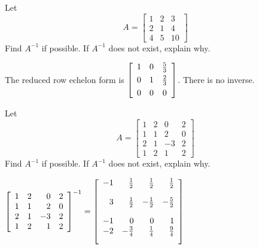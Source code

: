 \documentclass{ximera}
\begin{document}
\begin{problem}\label{prb:4.42}Let
\begin{equation*}
A=\left[
\begin{array}{rrr}
1 & 2 & 3 \\
2 & 1 & 4 \\
4 & 5 & 10
\end{array}
\right]
\end{equation*}
Find $A^{-1}$ if possible. If $A^{-1}$ does not exist, explain why.
\begin{hint}
The reduced row echelon form is
$\left[
\begin{array}{ccc}
1 & 0 & \vspace{0.05in}\frac{5}{3} \\
0 & 1 & \vspace{0.05in}\frac{2}{3} \\
0 & 0 & 0
\end{array}
\right]$. There is no inverse.
\end{hint}
\end{problem}

\begin{problem}\label{prb:4.43}Let
\begin{equation*}
A=\left[
\begin{array}{rrrr}
1 & 2 & 0 & 2 \\
1 & 1 & 2 & 0 \\
2 & 1 & -3 & 2 \\
1 & 2 & 1 & 2
\end{array}
\right]
\end{equation*}
Find $A^{-1}$ if possible. If $A^{-1}$ does not exist, explain why.
\begin{hint}
$\left[
\begin{array}{rrrr}
1 & 2 & 0 & 2 \\
1 & 1 & 2 & 0 \\
2 & 1 & -3 & 2 \\
1 & 2 & 1 & 2
\end{array}
\right]^{-1}= \left[
\begin{array}{rrrr}
-1 & \vspace{0.05in}\frac{1}{2} &  \vspace{0.05in}\frac{1}{2} &  \vspace{0.05in}\frac{1}{2} \\
3 &  \vspace{0.05in}\frac{1}{2} & - \vspace{0.05in}\frac{1}{2} & - \vspace{0.05in}\frac{5}{2} \\
-1 & 0 & 0 & 1 \\
-2 & - \vspace{0.05in}\frac{3}{4} &  \vspace{0.05in}\frac{1}{4} &  \vspace{0.05in}\frac{9}{4}
\end{array}
\right]$
\end{hint}
\end{problem}
\end{document}
